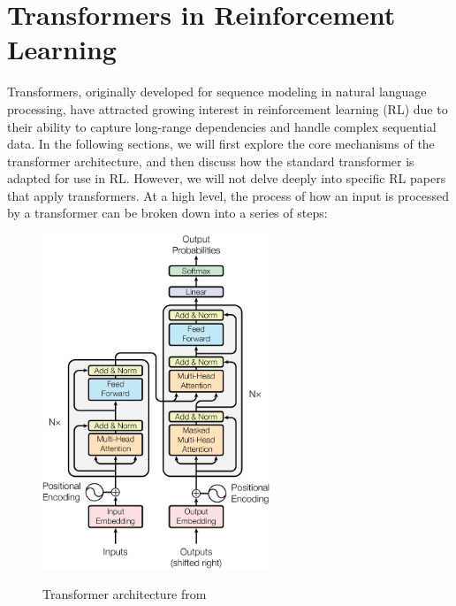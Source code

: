 \section{Transformers in Reinforcement Learning}
Transformers, originally developed for sequence modeling in natural language processing, have attracted growing interest in 
reinforcement learning (RL) due to their ability to capture long-range dependencies and handle complex sequential data. In the 
following sections, we will first explore the core mechanisms of the transformer architecture, and then discuss how the standard 
transformer is adapted for use in RL. However, we will not delve deeply into specific RL papers that apply transformers.
At a high level, the process of how an input is processed by a transformer can be broken down into a series of steps: \newline
\vspace{-0.8cm}
\begin{figure}
    \caption{Transformer architecture from \cite{vaswani2023attentionneed}}
    \includegraphics[height=10cm]{images/ModalNet-21.png}
    \label{transformer}
\end{figure}
